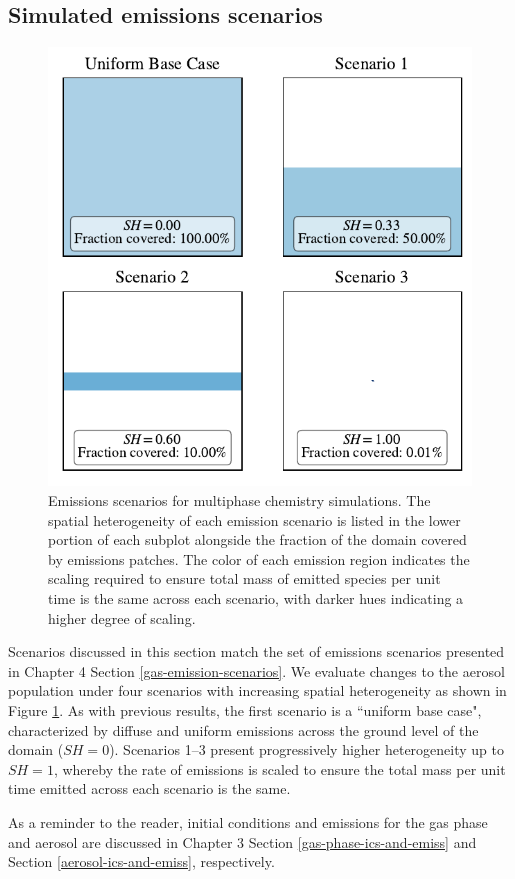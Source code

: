 \subsection{Simulated emissions scenarios}

\begin{figure}[t]
  \centering
    \includegraphics[width=.6\textwidth]{figures/SH-scenarios-main-runs.pdf}
    \caption{Emissions scenarios for multiphase chemistry simulations. The spatial heterogeneity of each emission scenario is listed in the lower portion of each subplot alongside the fraction of the domain covered by emissions patches. The color of each emission region indicates the scaling required to ensure total mass of emitted species per unit time is the same across each scenario, with darker hues indicating a higher degree of scaling.
}
    \label{fig:aerosol-emission-scenarios}
\end{figure}

Scenarios discussed in this section match the set of emissions scenarios presented in Chapter 4 Section \ref{gas-emission-scenarios}. We evaluate changes to the aerosol population under four scenarios with increasing spatial heterogeneity as shown in Figure \ref{fig:aerosol-emission-scenarios}. As with previous results, the first scenario is a ``uniform base case", characterized by diffuse and uniform emissions across the ground level of the domain ($SH=0$). Scenarios 1--3 present progressively higher heterogeneity up to $SH=1$, whereby the rate of emissions is scaled to ensure the total mass per unit time emitted across each scenario is the same.

As a reminder to the reader, initial conditions and emissions for the gas phase and aerosol are discussed in Chapter 3 Section \ref{gas-phase-ics-and-emiss} and Section \ref{aerosol-ics-and-emiss}, respectively. 


